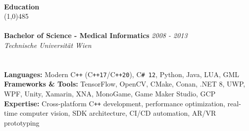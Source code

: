 \documentclass[9pt]{extarticle}
\newcommand\negativespace[1][-0.12cm]{\hspace*{#1}}
\begin{document}
\noindent %
\\
\vspace*{-6pt}
{\negativespace \Large \bf Education}\\
\line(1,0){485}\\
\\
\noindent
{\bf Bachelor of Science - Medical Informatics} \hfill \textit{2008 - 2013} \\
\textit{Technische Universität Wien} \\
\\
\\
{\bf Languages:} Modern C\texttt{++} (C\texttt{++17}/C\texttt{++20}), C\texttt{\# 12}, Python, Java, LUA, GML \\
{\bf Frameworks \& Tools:} TensorFlow, OpenCV, CMake, Conan, .NET 8, UWP, WPF, Unity, Xamarin, XNA, MonoGame, Game Maker Studio, GCP \\
{\bf Expertise:} Cross-platform C\texttt{++} development, performance optimization, real-time computer vision, SDK architecture, CI/CD automation, AR/VR prototyping
	
\end{document}
